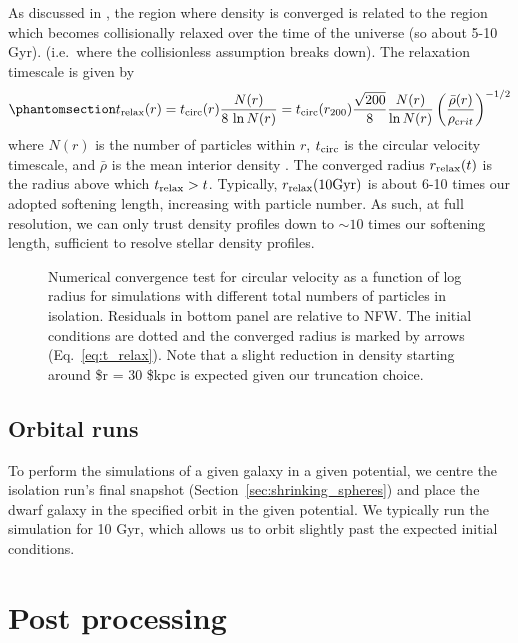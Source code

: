 As discussed in \citet{power+2003}, the region where density is
converged is related to the region which becomes collisionally relaxed
over the time of the universe (so about 5-10 Gyr). (i.e.~where the
collisionless assumption breaks down). The relaxation timescale is given
by \begin{equation}\protect\phantomsection\label{eq:t_relax}{
t_{\rm relax}(r) = t_{\rm circ}(r) \frac{N(r)}{8\,\ln N(r)}
= {t_{\rm circ}(r_{200})} \frac{\sqrt{200}}{8} \frac{N(r)}{\ln N(r)} \left(\frac{\bar \rho (r)}{\rho_{\textrm crit}}\right)^{-1/2}
}\end{equation} where \(N(r)\) is the number of particles within \(r\),
\(t_{\rm circ}\) is the circular velocity timescale, and \(\bar \rho\)
is the mean interior density \citep{power+2003}. The converged radius
\(r_{\rm relax}(t)\) is the radius above which \(t_{\rm relax} > t\).
Typically, \(r_{\rm relax}(10{\rm Gyr})\) is about 6-10 times our adopted
softening length, increasing with particle number. As such, at full
resolution, we can only trust density profiles down to \(\sim10\) times
our softening length, sufficient to resolve stellar density profiles.

\begin{figure}
\centering
{}
\caption[Numerical halo convergence]{Numerical convergence test for
circular velocity as a function of log radius for simulations with
different total numbers of particles in isolation. Residuals in bottom
panel are relative to NFW. The initial conditions are dotted and the
converged radius is marked by arrows (Eq.~\ref{eq:t_relax}). Note that a
slight reduction in density starting around \$r = 30 \$kpc is expected
given our truncation choice.}\label{fig:numerical_convergance}
\end{figure}

\subsection{Orbital runs}\label{orbital-runs}

To perform the simulations of a given galaxy in a given potential, we
centre the isolation run's final snapshot
(Section~\ref{sec:shrinking_spheres}) and place the dwarf galaxy in the
specified orbit in the given potential. We typically run the simulation
for 10 Gyr, which allows us to orbit slightly past the expected initial
conditions.

\section{Post processing}\label{post-processing}

